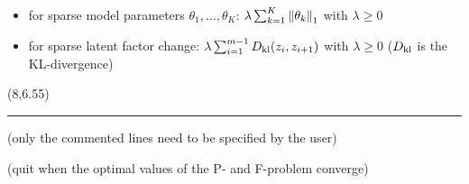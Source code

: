 \documentclass[a0]{a0poster}
\begin{document}
\begin{textblock}{7}
    \begin{itemize}
        \item for sparse model parameters $\theta_1, \ldots, \theta_K$: $\lambda \sum_{k = 1}^{K} {\lVert \theta_k \rVert}_1$ with $\lambda \geq 0$
        \item for sparse latent factor change: $\lambda \sum_{i = 1}^{m - 1} \mathop{D_{\rm kl}}(z_i, z_{i + 1})$ with $\lambda \geq 0$ ($\mathop{D_{\rm kl}}$ is the KL-divergence)
    \end{itemize}
\end{textblock}

\begin{textblock}{7}(8,6.55)
    \hrule\vspace*{0.5\baselineskip}
    (only the commented lines need to be specified by the user)
    

    (quit when the optimal values of the P- and F-problem converge)
    
\end{textblock}
\end{document}
